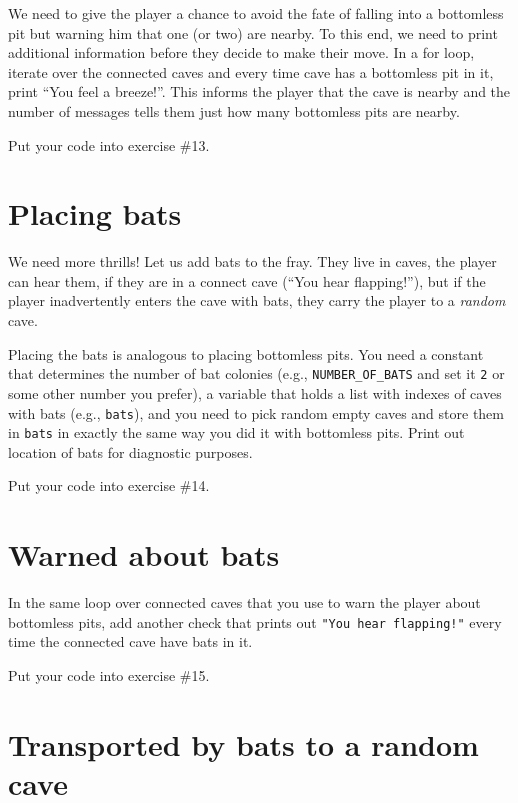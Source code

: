 \documentclass[
]{book}
\begin{document}
We need to give the player a chance to avoid the fate of falling into a bottomless pit but warning him that one (or two) are nearby. To this end, we need to print additional information before they decide to make their move. In a for loop, iterate over the connected caves and every time cave has a bottomless pit in it, print ``You feel a breeze!''. This informs the player that the cave is nearby and the number of messages tells them just how many bottomless pits are nearby.

Put your code into exercise \#13.

\hypertarget{placing-bats}{%
\section{Placing bats}\label{placing-bats}}

We need more thrills! Let us add bats to the fray. They live in caves, the player can hear them, if they are in a connect cave (``You hear flapping!''), but if the player inadvertently enters the cave with bats, they carry the player to a \emph{random} cave.

Placing the bats is analogous to placing bottomless pits. You need a constant that determines the number of bat colonies (e.g., \texttt{NUMBER\_OF\_BATS} and set it \texttt{2} or some other number you prefer), a variable that holds a list with indexes of caves with bats (e.g., \texttt{bats}), and you need to pick random empty caves and store them in \texttt{bats} in exactly the same way you did it with bottomless pits. Print out location of bats for diagnostic purposes.

Put your code into exercise \#14.

\hypertarget{warned-about-bats}{%
\section{Warned about bats}\label{warned-about-bats}}

In the same loop over connected caves that you use to warn the player about bottomless pits, add another check that prints out \texttt{"You\ hear\ flapping!"} every time the connected cave have bats in it.

Put your code into exercise \#15.

\hypertarget{transported-by-bats-to-a-random-cave}{%
\section{Transported by bats to a random cave}\label{transported-by-bats-to-a-random-cave}}
\end{document}
